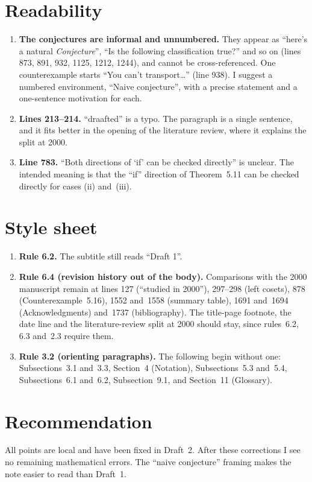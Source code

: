\documentclass[12pt,letterpaper]{article}
\begin{document}
\section{Readability}

\begin{enumerate}[label=\textbf{R\arabic*.},leftmargin=*,itemsep=4pt]
\item \textbf{The conjectures are informal and unnumbered.} They appear as
  ``here's a natural \emph{Conjecture}'', ``Is the following classification
  true?'' and so on (lines 873, 891, 932, 1125, 1212, 1244), and cannot be
  cross-referenced. One counterexample starts ``You can't transport\dots''
  (line 938). I suggest a numbered environment, ``Naive conjecture'', with a
  precise statement and a one-sentence motivation for each.
\item \textbf{Lines 213--214.} ``draafted'' is a typo. The paragraph is a
  single sentence, and it fits better in the opening of the literature
  review, where it explains the split at 2000.
\item \textbf{Line 783.} ``Both directions of `if' can be checked directly''
  is unclear. The intended meaning is that the ``if'' direction of
  Theorem~5.11 can be checked directly for cases (ii) and~(iii).
\end{enumerate}

\section{Style sheet}

\begin{enumerate}[label=\textbf{S\arabic*.},leftmargin=*,itemsep=4pt]
\item \textbf{Rule 6.2.} The subtitle still reads ``Draft 1''.
\item \textbf{Rule 6.4 (revision history out of the body).} Comparisons with
  the 2000 manuscript remain at lines 127 (``studied in 2000''), 297--298
  (left cosets), 878 (Counterexample~5.16), 1552 and~1558 (summary table),
  1691 and~1694 (Acknowledgments) and~1737 (bibliography). The title-page
  footnote, the date line and the literature-review split at 2000 should
  stay, since rules~6.2, 6.3 and~2.3 require them.
\item \textbf{Rule 3.2 (orienting paragraphs).} The following begin without
  one: Subsections~3.1 and~3.3, Section~4 (Notation), Subsections~5.3
  and~5.4, Subsections~6.1 and~6.2, Subsection~9.1, and Section~11
  (Glossary).
\end{enumerate}

\section*{Recommendation}

All points are local and have been fixed in Draft~2. After these
corrections I see no remaining mathematical errors. The ``naive
conjecture'' framing makes the note easier to read than Draft~1.
\end{document}
